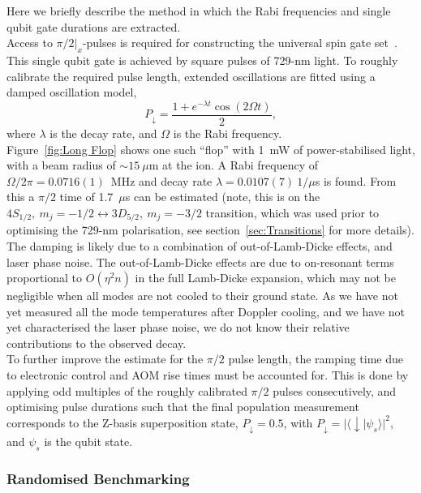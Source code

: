     Here we briefly describe the method in which the Rabi frequencies and single qubit gate durations are extracted.\\
    Access to $\pi/2|_x$-pulses is required for constructing the universal spin gate set~\cite{}. This single qubit gate is achieved by square pulses of 729-nm light. To roughly calibrate the required pulse length, extended oscillations are fitted using a damped oscillation model,
    \begin{equation}
        P_{\downarrow} = \frac{1 + e^{-\lambda t} \cos(2 \Omega t)}{2},
    \end{equation}
    where $\lambda$ is the decay rate, and $\Omega$ is the Rabi frequency.\\
    Figure~\ref{fig:Long Flop} shows one such ``flop'' with 1~mW of power-stabilised light, with a beam radius of $\sim 15 ~\mu$m at the ion. A Rabi frequency of $\Omega/2\pi = 0.0716(1)$~MHz and
    decay rate $\lambda = 0.0107(7)~1/\mu$s is found. From this a $\pi/2$ time of 1.7~$\mu$s can be estimated (note, this is on the $4S_{1/2},~m_j = -1/2 \leftrightarrow 3D_{5/2},~m_j = -3/2$ transition, which was used prior to optimising the 729-nm polarisation, see section~\ref{sec:Transitions} for more details).\\
    The damping is likely due to a combination of out-of-Lamb-Dicke effects, and laser phase noise. The out-of-Lamb-Dicke effects are due to on-resonant terms proportional to $O(\eta^2 n)$ in the full Lamb-Dicke expansion, which may not be negligible when all modes are not cooled to their ground state. As we have not yet measured all the mode temperatures after Doppler cooling, and we have not yet characterised the laser phase noise, we do not know their relative contributions to the observed decay.\\
     To further improve the estimate for the $\pi/2$ pulse length, the ramping time due to electronic control and AOM rise times must be accounted for. This is done by applying odd multiples of the roughly calibrated $\pi/2$ pulses consecutively, and optimising pulse durations such that the final population measurement corresponds to the Z-basis superposition state, $P_{\downarrow}= 0.5$, with $P_\downarrow = |\langle \downarrow | \psi_s \rangle|^2$, and $\psi_s$ is the qubit state. \\

\subsubsection{Randomised Benchmarking}

